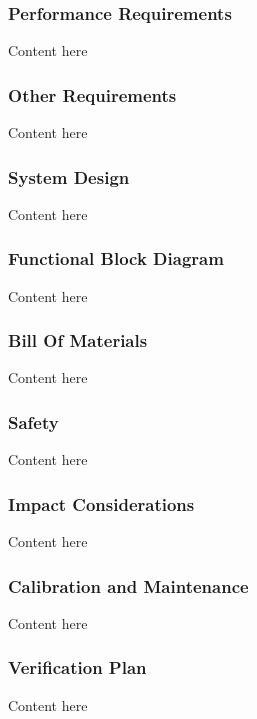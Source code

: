 \documentclass[aspectratio=169]{beamer}
\begin{document}
\begin{frame}
    \frametitle{Performance Requirements}

    Content here

\end{frame}


\begin{frame}
    \frametitle{Other Requirements}

    Content here

\end{frame}


\begin{frame}
    \frametitle{System Design}

    Content here

\end{frame}


\begin{frame}
    \frametitle{Functional Block Diagram}

    Content here

\end{frame}


\begin{frame}
    \frametitle{Bill Of Materials}

    Content here

\end{frame}


\begin{frame}
    \frametitle{Safety}

    Content here

\end{frame}


\begin{frame}
    \frametitle{Impact Considerations}

    Content here

\end{frame}


\begin{frame}
    \frametitle{Calibration and Maintenance}

    Content here

\end{frame}


\begin{frame}
    \frametitle{Verification Plan}

    Content here

\end{frame}
\end{document}
